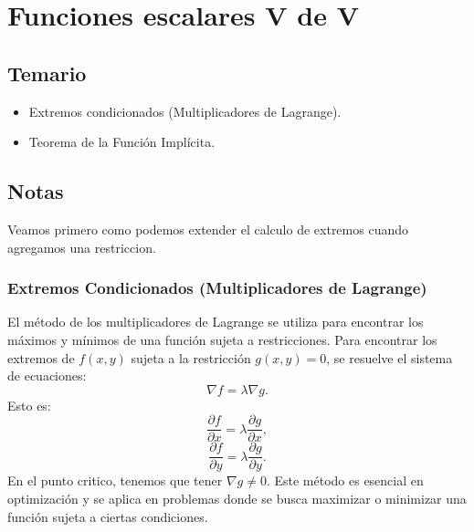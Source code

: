 \documentclass[11pt]{book}
\theoremstyle{definicion}
\theoremstyle{teorema}
\theoremstyle{ejemplo}
\begin{document}
\chapter{Funciones escalares V de V}

\section{Temario}

\begin{itemize}
    \item Extremos condicionados (Multiplicadores de Lagrange).
    \item Teorema de la Función Implícita.
\end{itemize}

\section{Notas}


\noindent
Veamos primero como podemos extender el calculo de extremos cuando agregamos una restriccion.

\subsection{Extremos Condicionados (Multiplicadores de Lagrange)}

El método de los multiplicadores de Lagrange se utiliza para encontrar los máximos y mínimos de una función sujeta a restricciones. Para encontrar los extremos de \( f(x, y) \) sujeta a la restricción \( g(x, y) = 0 \), se resuelve el sistema de ecuaciones:
\[ \nabla f = \lambda \nabla g. \]
Esto es:
\[ \frac{\partial f}{\partial x} = \lambda \frac{\partial g}{\partial x}, \]
\[ \frac{\partial f}{\partial y} = \lambda \frac{\partial g}{\partial y}. \]
En el punto critico, tenemos que tener $\nabla g \neq 0$.
Este método es esencial en optimización y se aplica en problemas donde se busca maximizar o minimizar una función sujeta a ciertas condiciones.
\end{document}
